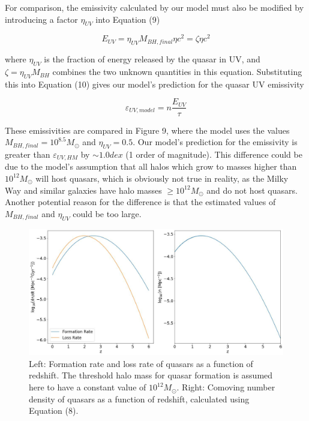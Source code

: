 \documentclass[12pt, twocolumn]{report}%
\begin{document}
For comparison, the emissivity calculated by our model must also be modified by introducing a factor $\eta_{UV}$ into Equation (9)

\begin{equation}
    E_{UV}=\eta_{UV}M_{BH,final}\eta c^2=\zeta\eta c^2
\end{equation}

\noindent where $\eta_{UV}$ is the fraction of energy released by the quasar in UV, and $\zeta=\eta_{UV}M_{BH}$ combines the two unknown quantities in this equation. Substituting this into Equation (10) gives our model's prediction for the quasar UV emissivity

\begin{equation}
    \varepsilon_{UV,model}=n\frac{E_{UV}}{\tau}
\end{equation}

These emissivities are compared in Figure 9, where the model uses the values $M_{BH,final}=10^{8.5}M_\odot$ and $\eta_{UV}=0.5$. Our model's prediction for the emissivity is greater than $\varepsilon_{UV,HM}$ by $\sim1.0dex$ (1 order of magnitude). This difference could be due to the model's assumption that all halos which grow to masses higher than $10^12M_\odot$ will host quasars, which is obviously not true in reality, as the Milky Way and similar galaxies have halo masses $\geq10^{12}M_\odot$ and do not host quasars. Another potential reason for the difference is that the estimated values of $M_{BH,final}$ and $\eta_{UV}$ could be too large.

\clearpage

\onecolumngrid


\begin{figure}[H]
\centering
\includegraphics[width=\linewidth]{Plot_7_2.jpeg}
\caption{Left: Formation rate and loss rate of quasars as a function of redshift. The threshold halo mass for quasar formation is assumed here to have a constant value of $10^{12}M_\odot$. Right: Comoving number density of quasars as a function of redshift, calculated using Equation (8).}
\label{fig:7}
\end{figure}
\end{document}
